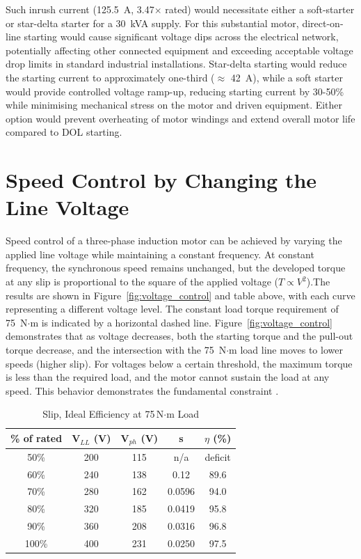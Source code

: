 \documentclass[a4paper,11pt]{IEEEtran}
\begin{document}
Such inrush current (\SI{125.5}{A}, 3.47$\times$ rated) would necessitate either a soft-starter or star-delta starter for a \SI{30}{kVA} supply. For this substantial motor, direct-on-line starting would cause significant voltage dips across the electrical network\cite{dol_motor_starter}, potentially affecting other connected equipment and exceeding acceptable voltage drop limits in standard industrial installations\cite{dol_comparison}. Star-delta starting would reduce the starting current to approximately one-third ($\approx$ \SI{42}{A})\cite{abb_handbook}, while a soft starter would provide controlled voltage ramp-up, reducing starting current by 30-50\% while minimising mechanical stress on the motor and driven equipment\cite{soft_starter_benefits}. Either option would prevent overheating of motor windings and extend overall motor life compared to DOL starting\cite{soft_starter_benefits}.

 

\section{Speed Control by Changing the Line Voltage}
Speed control of a three-phase induction motor can be achieved by varying the applied line voltage while maintaining a constant frequency. At constant frequency, the synchronous speed remains unchanged, but the developed torque at any slip is proportional to the square of the applied voltage ($T \propto V^2$)\cite{dukare2017stator}.The results are shown in Figure~\ref{fig:voltage_control} and table above, with each curve representing a different voltage level. The constant load torque requirement of 75~N$\cdot$m is indicated by a horizontal dashed line. Figure~\ref{fig:voltage_control} demonstrates that as voltage decreases, both the starting torque and the pull-out torque decrease, and the intersection with the 75~N$\cdot$m load line moves to lower speeds (higher slip). For voltages below a certain threshold, the maximum torque is less than the required load, and the motor cannot sustain the load at any speed. This behavior demonstrates the fundamental constraint \cite{fitzgerald2020}. 


 
\begin{table}[h]
\label{tab:slip_eff}
\centering
\caption{Slip, Ideal Efficiency at 75\,N$\cdot$m Load}
\begin{tabular}{|c|c|c|c|c|}
\hline
\% of rated& \textbf{V$_{LL}$ (V)} & \textbf{V$_{ph}$ (V)} & \textbf{s} & \textbf{$\eta$ (\%)} \\
\hline
50\% & 200 & 115 &n/a
& deficit \\
\hline
60\% & 240 & 138 & 0.12 & 89.6 \\
\hline
70\% & 280 & 162 & 0.0596 & 94.0 \\
\hline
80\% & 320 & 185 & 0.0419 & 95.8 \\
\hline
90\% & 360 & 208 & 0.0316 & 96.8 \\
\hline
100\% & 400 & 231 & 0.0250 & 97.5 \\
\hline

\end{tabular}
\end{table}
\end{document}
